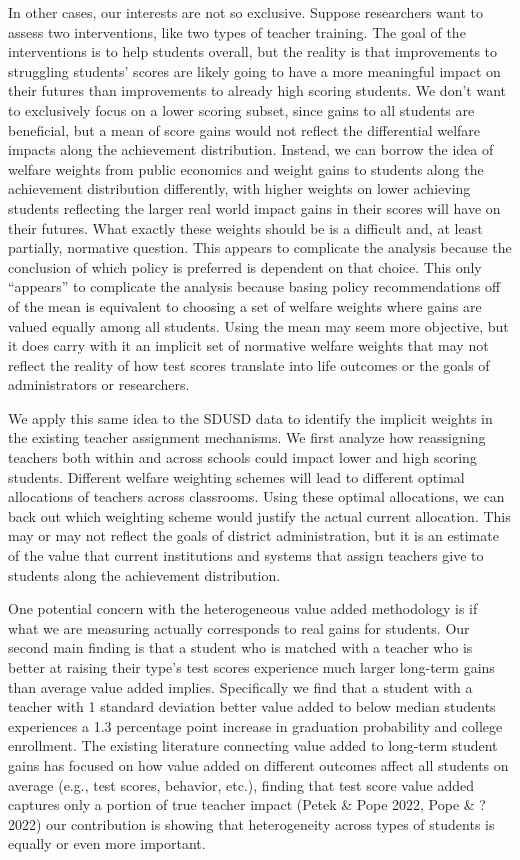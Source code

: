 \documentclass[letterpaper,12pt]{article}
\begin{document}
In other cases, our interests are not so exclusive. Suppose researchers want to assess two interventions, like two types of teacher training. The goal of the interventions is to help students overall, but the reality is that improvements to struggling students' scores are likely going to have a more meaningful impact on their futures than improvements to already high scoring students. We don’t want to exclusively focus on a lower scoring subset, since gains to all students are beneficial, but a mean of score gains would not reflect the differential welfare impacts along the achievement distribution. Instead, we can borrow the idea of welfare weights from public economics and weight gains to students along the achievement distribution differently, with higher weights on lower achieving students reflecting the larger real world impact gains in their scores will have on their futures. What exactly these weights should be is a difficult and, at least partially, normative question. This appears to complicate the analysis because the conclusion of which policy is preferred is dependent on that choice. This only “appears” to complicate the analysis because basing policy recommendations off of the mean is equivalent to choosing a set of welfare weights where gains are valued equally among all students. Using the mean may seem more objective, but it does carry with it an implicit set of normative welfare weights that may not reflect the reality of how test scores translate into life outcomes or the goals of administrators or researchers. 

We apply this same idea to the SDUSD data to identify the implicit weights in the existing teacher assignment mechanisms. We first analyze how reassigning teachers both within and across schools could impact lower and high scoring students. Different welfare weighting schemes will lead to different optimal allocations of teachers across classrooms. Using these optimal allocations, we can back out which weighting scheme would justify the actual current allocation. This may or may not reflect the goals of district administration, but it is an estimate of the value that current institutions and systems that assign teachers give to students along the achievement distribution. 

One potential concern with the heterogeneous value added methodology is if what we are measuring actually corresponds to real gains for students. Our second main finding is that a student who is matched with a teacher who is better at raising their type’s test scores experience much larger long-term gains than average value added implies. Specifically we find that a student with a teacher with 1 standard deviation better value added to below median students experiences a 1.3 percentage point increase in graduation probability and college enrollment. The existing literature connecting value added to long-term student gains has focused on how value added on different outcomes affect all students on average (e.g., test scores, behavior, etc.), finding that test score value added captures only a portion of true teacher impact (Petek & Pope 2022, Pope & ? 2022) our contribution is showing that heterogeneity across types of students is equally or even more important.
\end{document}
